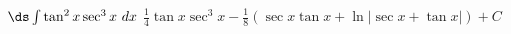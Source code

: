 {$\ds \int \tan^2x\sec^3x\ dx$}
{$\frac14\tan x\sec^3x -\frac18\left(\sec x\tan x+\ln|\sec x+\tan x|\right)  +C$}
